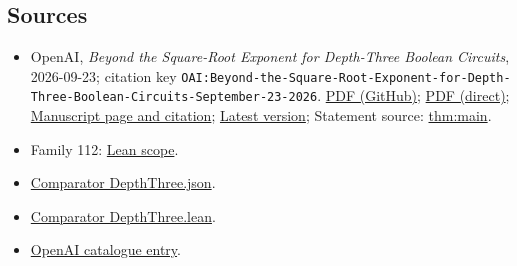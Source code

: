\documentclass[11pt]{article}
\begin{document}
\subsection{Sources}
\begin{itemize}
\item OpenAI, \emph{Beyond the Square-Root Exponent for Depth-Three Boolean Circuits}, 2026-09-23; citation key \texttt{OAI:Beyond-the-Square-Root-Exponent-for-Depth-Three-Boolean-Circuits-September-23-2026}. \href{https://github.com/openai/math/blob/adc7f1241b42e322a6451854ab7e4b4c146bf78a/preprints/Beyond-the-Square-Root-Exponent-for-Depth-Three-Boolean-Circuits-September-23-2026/main.pdf}{PDF (GitHub)}; \href{https://github.com/openai/math/raw/adc7f1241b42e322a6451854ab7e4b4c146bf78a/preprints/Beyond-the-Square-Root-Exponent-for-Depth-Three-Boolean-Circuits-September-23-2026/main.pdf}{PDF (direct)}; \href{https://github.com/openai/math/blob/adc7f1241b42e322a6451854ab7e4b4c146bf78a/preprints/Beyond-the-Square-Root-Exponent-for-Depth-Three-Boolean-Circuits-September-23-2026/README.md}{Manuscript page and citation}; \href{https://github.com/openai/math/blob/main/preprints/Beyond-the-Square-Root-Exponent-for-Depth-Three-Boolean-Circuits-September-23-2026/main.pdf}{Latest version}; Statement source: \href{https://github.com/openai/math/blob/adc7f1241b42e322a6451854ab7e4b4c146bf78a/preprints/Beyond-the-Square-Root-Exponent-for-Depth-Three-Boolean-Circuits-September-23-2026/build/latex/sections/00\_introduction.tex\#L21}{thm:main}.
\item Family 112: \href{https://github.com/openai/math/blob/adc7f1241b42e322a6451854ab7e4b4c146bf78a/lean/docs/112.md}{Lean scope}.
\item \href{https://github.com/openai/math/blob/adc7f1241b42e322a6451854ab7e4b4c146bf78a/lean/ComparatorChallenges/DepthThree.json}{Comparator DepthThree.json}.
\item \href{https://github.com/openai/math/blob/adc7f1241b42e322a6451854ab7e4b4c146bf78a/lean/ComparatorChallenges/DepthThree.lean}{Comparator DepthThree.lean}.
\item \href{https://github.com/openai/math/blob/adc7f1241b42e322a6451854ab7e4b4c146bf78a/CONTENTS.md}{OpenAI catalogue entry}.
\end{itemize}
\end{document}
